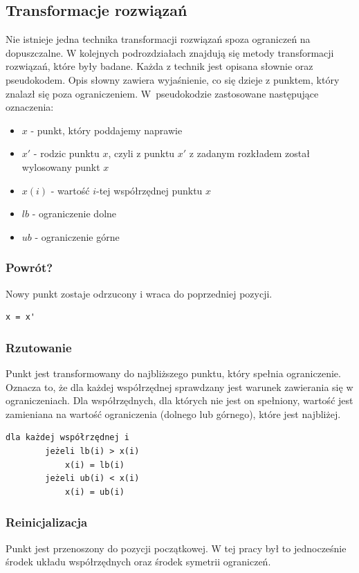 \documentclass{mini}
\begin{document}
\subsection{Transformacje rozwiązań} \label{transformacje}
Nie istnieje jedna technika transformacji rozwiązań spoza ograniczeń na dopuszczalne. W kolejnych podrozdziałach znajdują się metody transformacji rozwiązań, które były badane. Każda z technik jest opisana słownie oraz pseudokodem. Opis słowny zawiera wyjaśnienie, co się dzieje z punktem, który znalazł się poza ograniczeniem. W~pseudokodzie zastosowane następujące oznaczenia:
\begin{itemize}[noitemsep]
\item $x$ - punkt, który poddajemy naprawie
\item $x'$ - rodzic punktu $x$, czyli z punktu $x'$ z zadanym rozkładem został wylosowany punkt $x$
\item $x(i)$ - wartość $i$-tej współrzędnej punktu $x$
\item $lb$ - ograniczenie dolne
\item $ub$ - ograniczenie górne
\end{itemize}

\subsubsection{Powrót?}
Nowy punkt zostaje odrzucony i wraca do poprzedniej pozycji.

\begin{Verbatim}[baselinestretch=1.1]
	x = x'
\end{Verbatim}


\subsubsection{Rzutowanie}
Punkt jest transformowany do najbliższego punktu, który spełnia ograniczenie. Oznacza to, że dla każdej współrzędnej sprawdzany jest warunek zawierania się w ograniczeniach. Dla współrzędnych, dla których nie jest on spełniony, wartość jest zamieniana na wartość ograniczenia (dolnego lub górnego), które jest najbliżej.

\begin{Verbatim}[baselinestretch=1.1]
	dla każdej współrzędnej i
		jeżeli lb(i) > x(i)
			x(i) = lb(i)
		jeżeli ub(i) < x(i)
			x(i) = ub(i)
\end{Verbatim}

\subsubsection{Reinicjalizacja}
Punkt jest przenoszony do pozycji początkowej. W tej pracy był to jednocześnie środek układu współrzędnych oraz środek symetrii ograniczeń.
\end{document}
